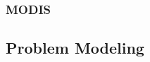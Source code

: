 \documentclass[preprint,review, 11pt,3p,authoryear]{elsarticle}
\newcommand{\rev}{\color{black}} %
\begin{document}
\subsubsection{MODIS}


\subsection{Problem Modeling}









\end{document}
